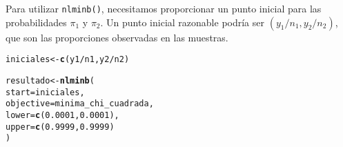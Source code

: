 \documentclass[paper=letter, fontsize=11pt, draft=false]{scrartcl}\usepackage[]{graphicx}\usepackage[]{xcolor}
\makeatletter
\newcommand{\hlnum}[1]{\textcolor[rgb]{0.686,0.059,0.569}{#1}}%
\newcommand{\hlopt}[1]{\textcolor[rgb]{0,0,0}{#1}}%
\newcommand{\hldef}[1]{\textcolor[rgb]{0.345,0.345,0.345}{#1}}%
\newcommand{\hlkwb}[1]{\textcolor[rgb]{0.69,0.353,0.396}{#1}}%
\newcommand{\hlkwc}[1]{\textcolor[rgb]{0.333,0.667,0.333}{#1}}%
\newcommand{\hlkwd}[1]{\textcolor[rgb]{0.737,0.353,0.396}{\textbf{#1}}}%
\newenvironment{kframe}{%
 \def\at@end@of@kframe{}%
 \ifinner\ifhmode%
  \def\at@end@of@kframe{\end{minipage}}%
  \begin{minipage}{\columnwidth}%
 \fi\fi%
 \def\FrameCommand##1{\hskip\@totalleftmargin \hskip-\fboxsep
 \colorbox{shadecolor}{##1}\hskip-\fboxsep
     \hskip-\linewidth \hskip-\@totalleftmargin \hskip\columnwidth}%
 \MakeFramed {\advance\hsize-\width
   \@totalleftmargin\z@ \linewidth\hsize
   \@setminipage}}%
 {\par\unskip\endMakeFramed%
 \at@end@of@kframe}
\newenvironment{knitrout}{}{} %
\numberwithin{equation}{problemcounter} %
\numberwithin{figure}{problemcounter} %
\numberwithin{table}{problemcounter} %
\numberwithin{subsection}{problemcounter}
\makeatother
\begin{document}
Para utilizar \texttt{nlminb()}, necesitamos proporcionar un punto inicial para las probabilidades $\pi_1$ y $\pi_2$. Un punto inicial razonable podría ser $(y_1/n_1, y_2/n_2)$, que son las proporciones observadas en las muestras.

\begin{knitrout}
\color{fgcolor}\begin{kframe}
\begin{alltt}
\hldef{iniciales} \hlkwb{<-} \hlkwd{c}\hldef{(y1}\hlopt{/}\hldef{n1, y2}\hlopt{/}\hldef{n2)}

\hldef{resultado} \hlkwb{<-} \hlkwd{nlminb}\hldef{(}
    \hlkwc{start} \hldef{= iniciales,}
    \hlkwc{objective} \hldef{= minima_chi_cuadrada,}
    \hlkwc{lower} \hldef{=} \hlkwd{c}\hldef{(}\hlnum{0.0001}\hldef{,} \hlnum{0.0001}\hldef{),}
    \hlkwc{upper} \hldef{=} \hlkwd{c}\hldef{(}\hlnum{0.9999}\hldef{,} \hlnum{0.9999}\hldef{)}
\hldef{)}
\end{alltt}
\end{kframe}
\end{knitrout}
\end{document}
